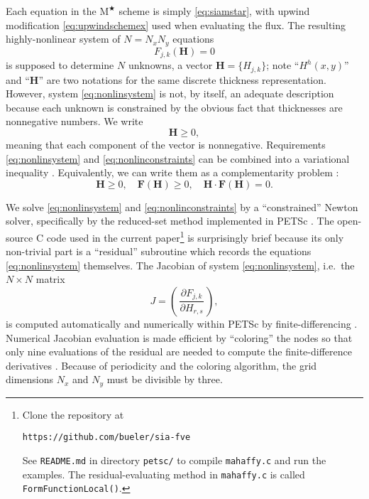 \documentclass[twocolumn,letterpaper]{igs}
\newcommand\bF{\mathbf{F}}
\newcommand\bH{\mathbf{H}}
\newcommand{\Mstar}{$\text{M}^{\bigstar}$\xspace}
\begin{document}
Each equation in the \Mstar scheme is simply \eqref{eq:siamstar}, with upwind modification \eqref{eq:upwindschemex} used when evaluating the flux.  The resulting highly-nonlinear system of $N=N_x N_y$ equations
\begin{equation}
F_{j,k}(\bH) = 0   \label{eq:nonlinsystem}
\end{equation}
is supposed to determine $N$ unknowns, a vector $\bH=\{H_{j,k}\}$; note ``$H^h(x,y)$'' and ``$\bH$'' are two notations for the same discrete thickness representation.  However, system \eqref{eq:nonlinsystem} is not, by itself, an adequate description because each unknown is constrained by the obvious fact that thicknesses are nonnegative numbers.  We write
\begin{equation}
\bH \ge 0,  \label{eq:nonlinconstraints}
\end{equation}
meaning that each component of the vector is nonnegative.  Requirements \eqref{eq:nonlinsystem} and \eqref{eq:nonlinconstraints} can be combined into a variational inequality \citep{JouvetBueler2012,KinderlehrerStampacchia1980}.  Equivalently, we can write them as a complementarity problem \citep{BensonMunson2006}:
\begin{equation}
\bH \ge 0, \quad \bF(\bH) \ge 0, \quad \bH \cdot \bF(\bH) = 0.  \label{eq:nonlincomplementarity}
\end{equation}

We solve \eqref{eq:nonlinsystem} and \eqref{eq:nonlinconstraints} by a ``constrained'' Newton solver, specifically by the reduced-set method \citep{BensonMunson2006} implemented in PETSc \citep{Balayetal2014}.  The open-source C code used in the current paper\footnote{Clone the repository at \begin{center}\texttt{https://github.com/bueler/sia-fve}\end{center}  See \texttt{README.md} in directory \texttt{petsc/} to compile \texttt{mahaffy.c} and run the examples.  The residual-evaluating method in \texttt{mahaffy.c} is called \texttt{FormFunctionLocal()}.} is surprisingly brief because its only non-trivial part is a ``residual'' subroutine which records the equations \eqref{eq:nonlinsystem} themselves.  The Jacobian of system \eqref{eq:nonlinsystem}, i.e.~the $N\times N$ matrix
\begin{equation}
J = \left(\,\frac{\partial F_{j,k}}{\partial H_{r,s}}\,\right),
\end{equation}
is computed automatically and numerically within PETSc by finite-differencing \citep{Kelley2003}.  Numerical Jacobian evaluation is made efficient by ``coloring'' the nodes so that only nine evaluations of the residual are needed to compute the finite-difference derivatives \citep{CurtisPowellReid1974}.  Because of periodicity and the coloring algorithm, the grid dimensions $N_x$ and $N_y$ must be divisible by three.
\end{document}
